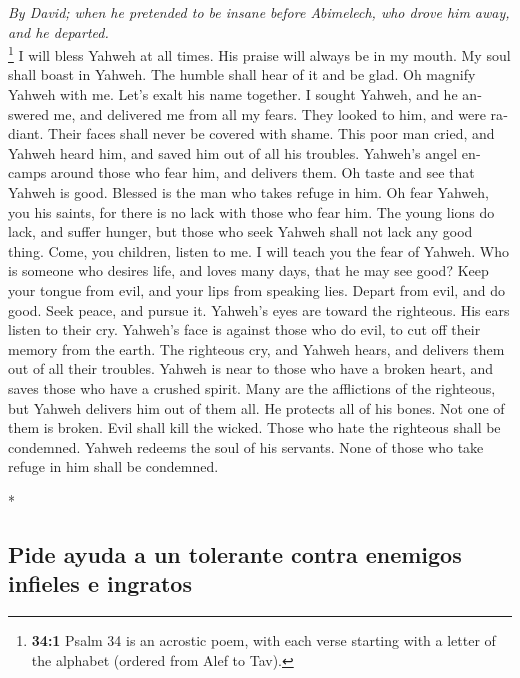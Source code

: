 \begin{paracol}{2}
\begin{otherlanguage}{english}
\emph{By David; when he pretended to be insane before Abimelech, who
drove him away, and he departed.}\\
 \footnote{\textbf{34:1} Psalm 34 is an acrostic poem,
  with each verse starting with a letter of the alphabet (ordered from
  Alef to Tav).} I will bless Yahweh at all times. His praise will
always be in my mouth.  My soul shall boast in Yahweh. The
humble shall hear of it and be glad.  Oh magnify Yahweh
with me. Let's exalt his name together.  I sought Yahweh,
and he answered me, and delivered me from all my fears. 
They looked to him, and were radiant. Their faces shall never be covered
with shame.  This poor man cried, and Yahweh heard him,
and saved him out of all his troubles.  Yahweh's angel
encamps around those who fear him, and delivers them.  Oh
taste and see that Yahweh is good. Blessed is the man who takes refuge
in him.  Oh fear Yahweh, you his saints, for there is no
lack with those who fear him.  The young lions do lack,
and suffer hunger, but those who seek Yahweh shall not lack any good
thing.  Come, you children, listen to me. I will teach
you the fear of Yahweh.  Who is someone who desires life,
and loves many days, that he may see good?  Keep your
tongue from evil, and your lips from speaking lies. 
Depart from evil, and do good. Seek peace, and pursue it.
 Yahweh's eyes are toward the righteous. His ears listen
to their cry.  Yahweh's face is against those who do
evil, to cut off their memory from the earth.  The
righteous cry, and Yahweh hears, and delivers them out of all their
troubles.  Yahweh is near to those who have a broken
heart, and saves those who have a crushed spirit.  Many
are the afflictions of the righteous, but Yahweh delivers him out of
them all.  He protects all of his bones. Not one of them
is broken.  Evil shall kill the wicked. Those who hate
the righteous shall be condemned.  Yahweh redeems the
soul of his servants. None of those who take refuge in him shall be
condemned.

\end{otherlanguage}

\switchcolumn[0]*

\hypertarget{pide-ayuda-a-un-tolerante-contra-enemigos-infieles-e-ingratos}{%
\subsection{Pide ayuda a un tolerante contra enemigos infieles e
ingratos}\label{pide-ayuda-a-un-tolerante-contra-enemigos-infieles-e-ingratos}}


\end{paracol}
